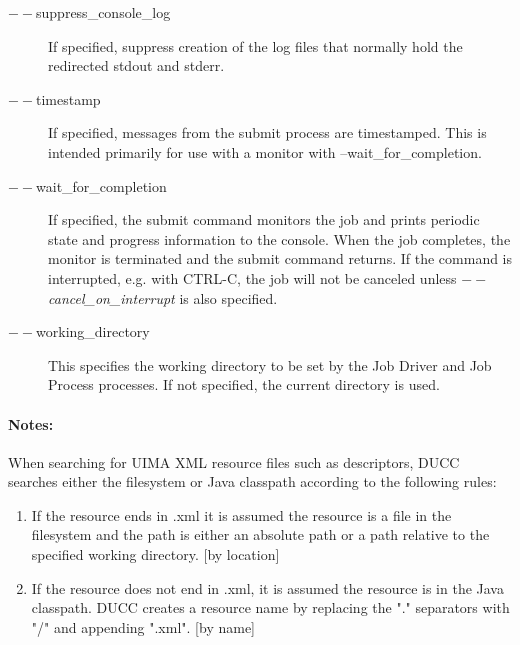 \begin{description}
           \item[$--$suppress\_console\_log] If specified, suppress creation of the log files that 
             normally hold the redirected stdout and stderr.

           \item[$--$timestamp ]
             If specified, messages from the submit process are timestamped. This is intended primarily 
             for use with a monitor with --wait\_for\_completion. 

           \item[$--$wait\_for\_completion ]             
             If specified, the submit command monitors the job and prints periodic
             state and progress information to the console.  When the job completes, the monitor
             is terminated and the submit command returns.  If the command is interrupted, e.g. with CTRL-C,
             the job will not be canceled unless {\em $--$cancel\_on\_interrupt} is also specified.
             
           \item[$--$working\_directory ]             
             This specifies the working directory to be set by the Job Driver and Job Process processes. 
             If not specified, the current directory is used.
  \end{description}
             
  \paragraph{Notes:}
  \label{par:cli.submit.notes}
  When searching for UIMA XML resource files such as descriptors, DUCC searches either the 
  filesystem or Java classpath according to the following rules:
  \begin{enumerate}
    \item If the resource ends in .xml it is assumed the resource is a file in the filesystem 
      and the path is either an absolute path or a path relative to the specified working directory. [by location]
    \item If the resource does not end in .xml, it is assumed the resource is in the Java
      classpath. DUCC creates a resource name by replacing the "." separators with "/" and appending ".xml". [by name]
  \end{enumerate}
